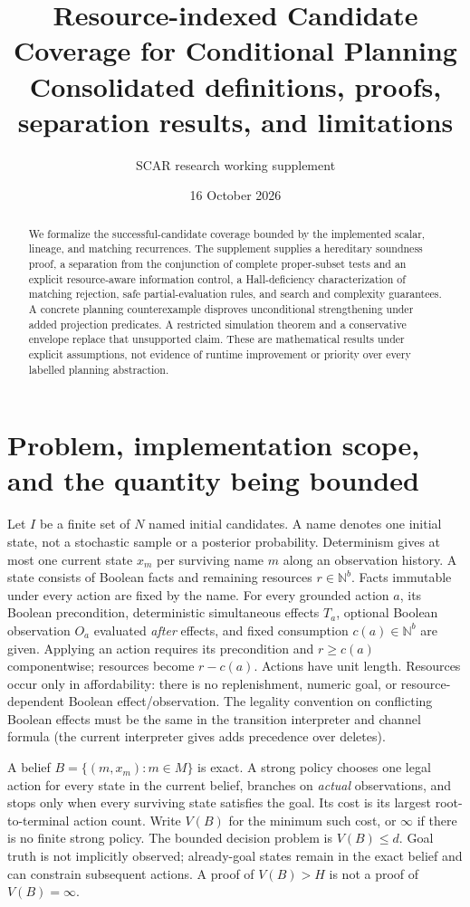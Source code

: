 \documentclass[11pt]{article}
\title{Resource-indexed Candidate Coverage for Conditional Planning\\
\large Consolidated definitions, proofs, separation results, and limitations}
\author{SCAR research working supplement}
\date{16 October 2026}
\theoremstyle{definition}
\begin{document}
\maketitle
\begin{abstract}
We formalize the successful-candidate coverage bounded by the implemented
scalar, lineage, and matching recurrences. The supplement supplies a hereditary
soundness proof, a separation from the conjunction of complete proper-subset
tests and an explicit resource-aware information control, a Hall-deficiency
characterization of matching rejection, safe partial-evaluation rules, and
search and complexity guarantees. A concrete planning counterexample disproves
unconditional strengthening under added projection predicates. A restricted
simulation theorem and a conservative envelope replace that unsupported claim.
These are mathematical results under explicit assumptions, not evidence of
runtime improvement or priority over every labelled planning abstraction.
\end{abstract}

\section{Problem, implementation scope, and the quantity being bounded}
Let $I$ be a finite set of $N$ named initial candidates. A name denotes one
initial state, not a stochastic sample or a posterior probability. Determinism
gives at most one current state $x_m$ per surviving name $m$ along an observation
history. A state consists of Boolean facts and remaining resources
$r\in\mathbb N^b$. Facts immutable under every action are fixed by the name.
For every grounded action $a$, its Boolean precondition, deterministic simultaneous
effects $T_a$, optional Boolean observation $O_a$ evaluated \emph{after} effects,
and fixed consumption $c(a)\in\mathbb N^b$ are given. Applying an action requires
its precondition and $r\geq c(a)$ componentwise; resources become $r-c(a)$.
Actions have unit length. Resources occur only in affordability: there is no
replenishment, numeric goal, or resource-dependent Boolean effect/observation.
The legality convention on conflicting Boolean effects must be the same in
the transition interpreter and channel formula (the current interpreter gives
adds precedence over deletes).

A belief $B=\{(m,x_m):m\in M\}$ is exact. A strong policy chooses one legal
action for every state in the current belief, branches on \emph{actual}
observations, and stops only when every surviving state satisfies the goal.
Its cost is its largest root-to-terminal action count. Write $V(B)$ for the
minimum such cost, or $\infty$ if there is no finite strong policy. The bounded
decision problem is $V(B)\leq d$. Goal truth is not implicitly observed;
already-goal states remain in the exact belief and can constrain subsequent
actions. A proof of $V(B)>H$ is not a proof of $V(B)=\infty$.
\end{document}
